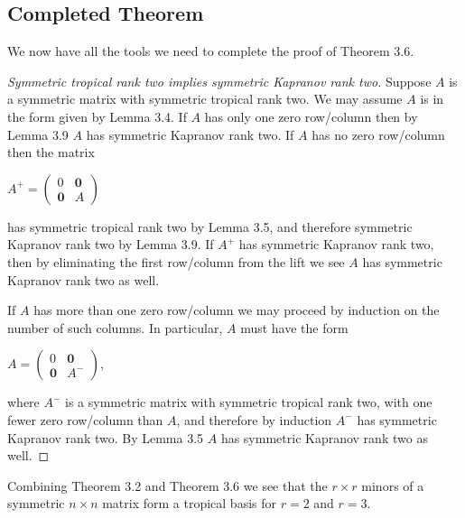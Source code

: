 \documentclass{article}
\begin{document}
\subsection{Completed Theorem}

We now have all the tools we need to complete the proof of Theorem 3.6.

\begin{proof}[Symmetric tropical rank two implies symmetric Kapranov rank two]
  Suppose $A$ is a symmetric matrix with symmetric tropical rank two. We may assume $A$ is in the form given by Lemma 3.4. If $A$ has only one zero row/column then by Lemma 3.9 $A$ has symmetric Kapranov rank two. If $A$ has no zero row/column then the matrix
  \begin{center}
    $A^{+} = \left(\begin{array}{cc} 0 & \textbf{0} \\ \textbf{0} & A \end{array}\right)$
  \end{center}
  has symmetric tropical rank two by Lemma 3.5, and therefore symmetric Kapranov rank two by Lemma 3.9. If $A^{+}$ has symmetric Kapranov rank two, then by eliminating the first row/column from the lift we see $A$ has symmetric Kapranov rank two as well.
  
  If $A$ has more than one zero row/column we may proceed by induction on the number of such columns. In particular, $A$ must have the form
  \begin{center}
    $A = \left(\begin{array}{cc} 0 & \textbf{0} \\ \textbf{0} & A^{-} \end{array}\right)$,
  \end{center}
  where $A^{-}$ is a symmetric matrix with symmetric tropical rank two, with one fewer zero row/column than $A$, and therefore by induction $A^{-}$ has symmetric Kapranov rank two. By Lemma 3.5 $A$ has symmetric Kapranov rank two as well.
\end{proof}

Combining Theorem 3.2 and Theorem 3.6 we see that the $r \times r$ minors of a symmetric $n \times n$ matrix form a tropical basis for $r = 2$ and $r = 3$.
\end{document}
